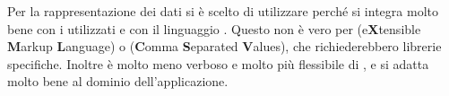 Per la rappresentazione dei dati si è scelto di utilizzare  perché si integra molto bene con i  utilizzati e con il linguaggio . Questo non è vero per  (e\textbf{X}tensible \textbf{M}arkup \textbf{L}anguage) o  (\textbf{C}omma \textbf{S}eparated \textbf{V}alues), che richiederebbero librerie specifiche. Inoltre  è molto meno verboso e molto più flessibile di , e si adatta molto bene al dominio dell'applicazione.
